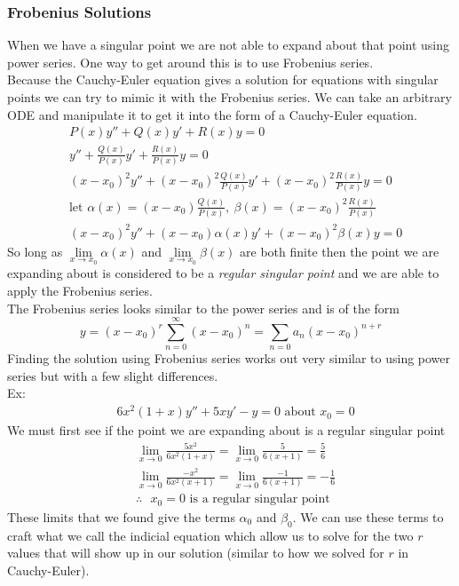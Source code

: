 \documentclass[11pt, fleqn]{article}
\begin{document}
\subsubsection{Frobenius Solutions}
When we have a singular point we are not able to expand about that point using power series. One way to get around this is to use Frobenius series.\\
Because the Cauchy-Euler equation gives a solution for equations with singular points we can try to mimic it with the Frobenius series. We can take an arbitrary ODE and manipulate it to get it into the form of a Cauchy-Euler equation.
\begin{align*}
    &P(x)y''+Q(x)y'+R(x)y=0\\
    &y''+\frac{Q(x)}{P(x)}y'+\frac{R(x)}{P(x)}y=0\\
    &(x-x_0)^2y''+(x-x_0)^2\frac{Q(x)}{P(x)}y'+(x-x_0)^2\frac{R(x)}{P(x)}y=0\\
    &\text{let }\alpha(x)=(x-x_0)\frac{Q(x)}{P(x)},\ \beta(x)=(x-x_0)^2\frac{R(x)}{P(x)}\\
    &(x-x_0)^2y''+(x-x_0)\alpha(x)y'+(x-x_0)^2\beta(x)y=0
\end{align*}
So long as $\lim\limits_{x\to x_0}\alpha(x)$ and $\lim\limits_{x\to x_0}\beta(x)$ are both finite then the point we are expanding about is considered to be a \textit{regular singular point} and we are able to apply the Frobenius series.\\
The Frobenius series looks similar to the power series and is of the form
$$y=(x-x_0)^r\sum_{n=0}^\infty(x-x_0)^n=\sum_{n=0}a_n(x-x_0)^{n+r}$$
Finding the solution using Frobenius series works out very similar to using power series but with a few slight differences.\\
Ex:
\begin{align*}
    &6x^2(1+x)y''+5xy'-y=0\text{ about }x_0=0
\end{align*}
We must first see if the point we are expanding about is a regular singular point
\begin{align*}
    &\lim_{x\to0}\frac{5x^2}{6x^2(1+x)}=\lim_{x\to0}\frac{5}{6(x+1)}=\frac{5}{6}\\
    &\lim_{x\to0}\frac{-x^2}{6x^2(x+1)}=\lim_{x\to0}\frac{-1}{6(x+1)}=-\frac{1}{6}\\
    &\therefore\text{ $x_0=0$ is a regular singular point}
\end{align*}
These limits that we found give the terms $\alpha_0$ and $\beta_0$. We can use these terms to craft what we call the indicial equation which allow us to solve for the two $r$ values that will show up in our solution (similar to how we solved for $r$ in Cauchy-Euler).
\end{document}
